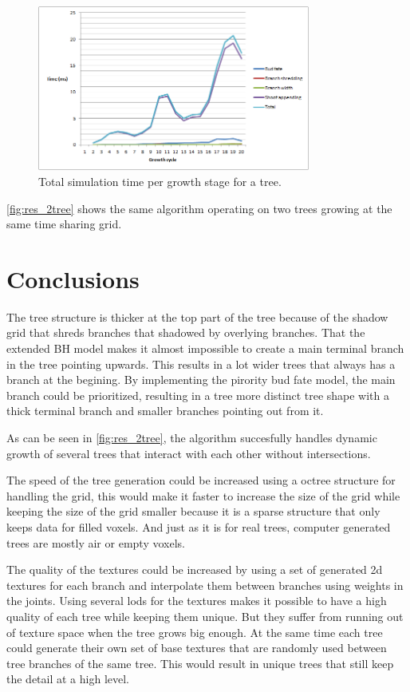 \documentclass[11pt]{article} %
\begin{document}
\begin{figure}[htp]
	\centering
	\includegraphics[width=0.8\textwidth]{timingTotal.png}
	\caption{Total simulation time per growth stage for a tree.}
	\label{fig:res_timingTotal}
\end{figure}

\autoref{fig:res_2tree} shows the same algorithm operating on two trees growing at the same time sharing grid.

\section{Conclusions}
The tree structure is thicker at the top part of the tree because of the shadow grid that shreds branches that shadowed by overlying branches.
That the extended BH model makes it almost impossible to create a main terminal branch in the tree pointing upwards.
This results in a lot wider trees that always has a branch at the begining.
By implementing the pirority bud fate model, the main branch could be prioritized, resulting in a tree more distinct tree shape with a thick terminal branch and smaller branches pointing out from it.

As can be seen in \autoref{fig:res_2tree}, the algorithm succesfully handles dynamic growth of several trees that interact with each other without intersections.

The speed of the tree generation could be increased using a octree structure for handling the grid, this would make it faster to increase the size of the grid while keeping the size of the grid smaller because it is a sparse structure that only keeps data for filled voxels.
And just as it is for real trees, computer generated trees are mostly air or empty voxels.

The quality of the textures could be increased by using a set of generated 2d textures for each branch and interpolate them between branches using weights in the joints.
Using several lods for the textures makes it possible to have a high quality of each tree while keeping them unique.
But they suffer from running out of texture space when the tree grows big enough.
At the same time each tree could generate their own set of base textures that are randomly used between tree branches of the same tree.
This would result in unique trees that still keep the detail at a high level.
\end{document}
